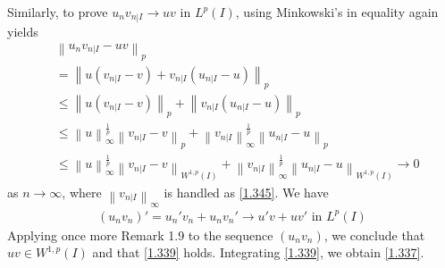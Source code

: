 \documentclass[a4paper,oneside]{book}
\numberwithin{equation}{chapter}
\begin{document}
Similarly, to prove ${u_n}{v_{\left. n \right|I}} \to uv$ in $L^p\left(I\right)$, using Minkowski's in equality again yields
\begin{align}
&{\left\| {{u_n}{v_{\left. n \right|I}} - uv} \right\|_p} \\
&= {\left\| {u\left( {{v_{\left. n \right|I}} - v} \right) + {v_{\left. n \right|I}}\left( {{u_{\left. n \right|I}} - u} \right)} \right\|_p}\\
& \le {\left\| {u\left( {{v_{\left. n \right|I}} - v} \right)} \right\|_p} + {\left\| {{v_{\left. n \right|I}}\left( {{u_{\left. n \right|I}} - u} \right)} \right\|_p}\\
& \le \left\| u \right\|_\infty ^{\frac{1}{p}}{\left\| {{v_{\left. n \right|I}} - v} \right\|_p} + \left\| {{v_{\left. n \right|I}}} \right\|_\infty ^{\frac{1}{p}}{\left\| {{u_{\left. n \right|I}} - u} \right\|_p}\\
& \le \left\| u \right\|_\infty ^{\frac{1}{p}}{\left\| {{v_{\left. n \right|I}} - v} \right\|_{{W^{1,p}}\left( I \right)}} + \left\| {{v_{\left. n \right|I}}} \right\|_\infty ^{\frac{1}{p}}{\left\| {{u_{\left. n \right|I}} - u} \right\|_{{W^{1,p}}\left( I \right)}} \to 0
\end{align}
as $n \to \infty$, where ${\left\| {{v_{\left. n \right|I}}} \right\|_\infty }$ is handled as \eqref{1.345}. We have
\begin{align}
\left( {{u_n}{v_n}} \right)' = {u_n}'{v_n} + {u_n}{v_n}' \to u'v + uv'\mbox{ in } {L^p}\left( I \right)
\end{align}
Applying once more Remark 1.9 to the sequence $\left(u_nv_n\right)$, we conclude that $uv\in W^{1,p}\left(I\right)$ and that \eqref{1.339} holds. Integrating \eqref{1.339}, we obtain \eqref{1.337}.
\end{document}
